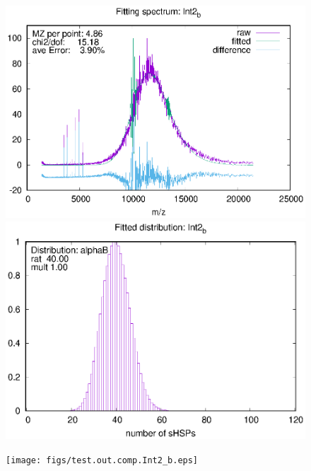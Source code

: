 \documentclass[a4paper,12pt]{report}
\begin{document}
\begin{figure}
\begin{minipage}[l]{0.323333\linewidth}
\centering
\includegraphics[trim=0mm 0mm 0mm 0mm, clip=true,width=1\textwidth]{figs/test.outInt2_b.eps}
\end{minipage}
\begin{minipage}[l]{0.323333\linewidth}
\centering
\includegraphics[trim=0mm 0mm 0mm 0mm, clip=true,width=1\textwidth]{figs/test.inpInt2_b.eps}
\end{minipage}
\begin{minipage}[l]{0.323333\linewidth}
\centering
\texttt{[image: figs/test.out.comp.Int2\_b.eps]}
\end{minipage}


\end{figure}
\end{document}
